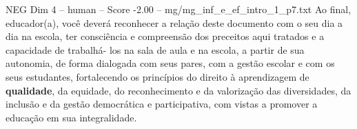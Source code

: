 \begin{textsample}{NEG Dim 4 – human – Score -2.00 – mg/mg\_inf\_e\_ef\_intro\_1\_p7.txt}  \label{ex:f4_neg_015}
Ao final, educador(a), você deverá reconhecer a relação deste documento com o seu dia a dia na escola, ter consciência e compreensão dos preceitos aqui tratados e a capacidade de trabalhá- los na sala de aula e na escola, a partir de sua autonomia, de forma dialogada com seus pares, com a gestão escolar e com os seus estudantes, fortalecendo os princípios do direito à aprendizagem de \textbf{qualidade}, da equidade, do reconhecimento e da valorização das diversidades, da inclusão e da gestão democrática e participativa, com vistas a promover a educação em sua integralidade.

\end{textsample}
